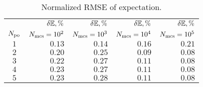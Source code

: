 \begin{table}
  \centering
  \caption{Normalized RMSE of expectation.}
  \vspace{-10pt}
  \begin{tabular}{crrrr}
    \toprule
    {} & $\delta\mathbb{E}, \%$ & $\delta\mathbb{E}, \%$ & $\delta\mathbb{E}, \%$ & $\delta\mathbb{E}, \%$ \\
    ${N_\text{po}}$ & $N_\text{mcs} = 10^2$ & $N_\text{mcs} = 10^3$ & $N_\text{mcs} = 10^4$ & $N_\text{mcs} = 10^5$ \\
    \midrule
    $1$ & $0.13$ & $0.14$ & $0.16$ & $0.21$ \\
    $2$ & $0.20$ & $0.25$ & $0.09$ & $0.08$ \\
    $3$ & $0.22$ & $0.27$ & $0.11$ & $0.08$ \\
    $4$ & $0.23$ & $0.27$ & $0.11$ & $0.08$ \\
    $5$ & $0.23$ & $0.28$ & $0.11$ & $0.08$ \\
    \bottomrule
  \end{tabular}
  \vspace{-10pt}
\end{table}
